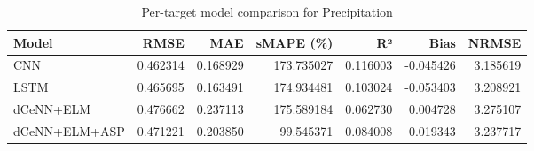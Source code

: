 \begin{table}
\caption{Per-target model comparison for Precipitation}
\begin{tabular}{lrrrrrr}
\toprule
Model & RMSE & MAE & sMAPE (\%) & R² & Bias & NRMSE \\
\midrule
CNN & 0.462314 & 0.168929 & 173.735027 & 0.116003 & -0.045426 & 3.185619 \\
LSTM & 0.465695 & 0.163491 & 174.934481 & 0.103024 & -0.053403 & 3.208921 \\
dCeNN+ELM & 0.476662 & 0.237113 & 175.589184 & 0.062730 & 0.004728 & 3.275107 \\
dCeNN+ELM+ASP & 0.471221 & 0.203850 & 99.545371 & 0.084008 & 0.019343 & 3.237717 \\
\bottomrule
\end{tabular}
\end{table}
